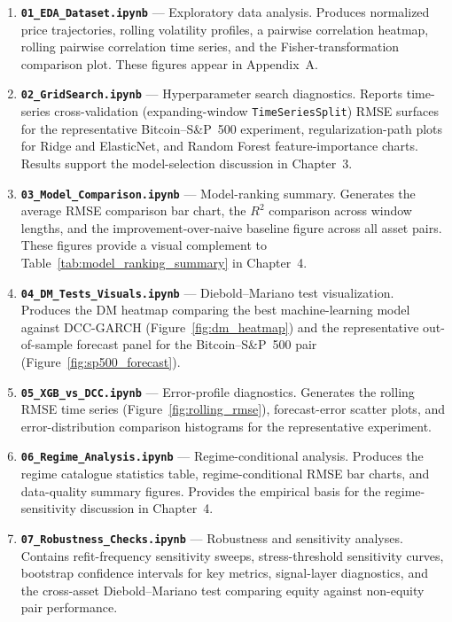 \begin{enumerate}
    \item \textbf{\texttt{01\_EDA\_Dataset.ipynb}} --- Exploratory data analysis. Produces normalized price trajectories, rolling volatility profiles, a pairwise correlation heatmap, rolling pairwise correlation time series, and the Fisher-transformation comparison plot. These figures appear in Appendix~A.

    \item \textbf{\texttt{02\_GridSearch.ipynb}} --- Hyperparameter search diagnostics. Reports time-series cross-validation (expanding-window \texttt{TimeSeriesSplit}) RMSE surfaces for the representative Bitcoin--S\&P~500 experiment, regularization-path plots for Ridge and ElasticNet, and Random Forest feature-importance charts. Results support the model-selection discussion in Chapter~3.

    \item \textbf{\texttt{03\_Model\_Comparison.ipynb}} --- Model-ranking summary. Generates the average RMSE comparison bar chart, the $R^2$ comparison across window lengths, and the improvement-over-naive baseline figure across all asset pairs. These figures provide a visual complement to Table~\ref{tab:model_ranking_summary} in Chapter~4.

    \item \textbf{\texttt{04\_DM\_Tests\_Visuals.ipynb}} --- Diebold--Mariano test visualization. Produces the DM heatmap comparing the best machine-learning model against DCC-GARCH (Figure~\ref{fig:dm_heatmap}) and the representative out-of-sample forecast panel for the Bitcoin--S\&P~500 pair (Figure~\ref{fig:sp500_forecast}).

    \item \textbf{\texttt{05\_XGB\_vs\_DCC.ipynb}} --- Error-profile diagnostics. Generates the rolling RMSE time series (Figure~\ref{fig:rolling_rmse}), forecast-error scatter plots, and error-distribution comparison histograms for the representative experiment.

    \item \textbf{\texttt{06\_Regime\_Analysis.ipynb}} --- Regime-conditional analysis. Produces the regime catalogue statistics table, regime-conditional RMSE bar charts, and data-quality summary figures. Provides the empirical basis for the regime-sensitivity discussion in Chapter~4.

    \item \textbf{\texttt{07\_Robustness\_Checks.ipynb}} --- Robustness and sensitivity analyses. Contains refit-frequency sensitivity sweeps, stress-threshold sensitivity curves, bootstrap confidence intervals for key metrics, signal-layer diagnostics, and the cross-asset Diebold--Mariano test comparing equity against non-equity pair performance.


\end{enumerate}
